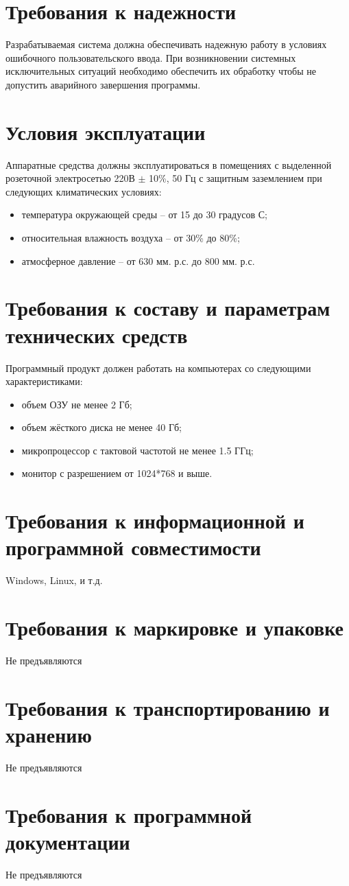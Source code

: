 \documentclass[14pt,oneside,final]{extreport}
\newcommand*\minus{\item[--]} %
\begin{document}
	\section{Требования к надежности}
	Разрабатываемая система должна обеспечивать надежную работу в условиях ошибочного пользовательского ввода. При возникновении системных исключительных ситуаций необходимо обеспечить их обработку чтобы не допустить аварийного завершения программы.

	\section{Условия эксплуатации}
	Аппаратные   средства   должны   эксплуатироваться   в помещениях с выделенной розеточной электросетью 220В \(\pm\) 10\%, 50 Гц  с  защитным  заземлением  при  следующих  климатических условиях:
	\begin{itemize}
	\minus температура окружающей среды – от 15 до 30 градусов С;
	\minus относительная влажность воздуха -- от 30\% до 80\%;
	\minus атмосферное давление -- от 630 мм. р.с. до 800 мм. р.с.
	\end{itemize}

	\section{Требования к составу и параметрам технических средств}
	Программный продукт должен работать на компьютерах со следующими характеристиками:
	\begin{itemize}
		\minus объем ОЗУ не менее 2 Гб;
		\minus объем жёсткого диска не менее 40 Гб;
		\minus микропроцессор с тактовой частотой не менее 1.5 ГГц;
		\minus монитор с разрешением от 1024*768 и выше.
	\end{itemize}

	\section{Требования к информационной и программной совместимости}
	Windows, Linux, и т.д.
	\section{Требования к маркировке и упаковке}
	     Не предъявляются
	\section{Требования к транспортированию и хранению}
	    Не предъявляются
	\section{Требования к программной документации}
	    Не предъявляются
\end{document}
